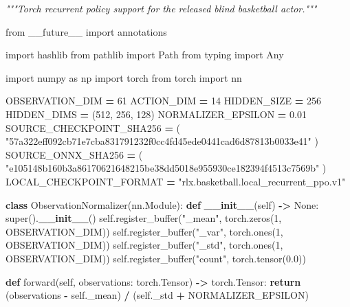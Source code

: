 \documentclass[
  chinese,
  11pt,
  letterpaper,
]{article}
\newenvironment{Shaded}{\begin{snugshade}}{\end{snugshade}}
\newcommand{\BuiltInTok}[1]{#1}
\newcommand{\CommentTok}[1]{\textcolor[rgb]{0.56,0.35,0.01}{\textit{#1}}}
\newcommand{\ControlFlowTok}[1]{\textcolor[rgb]{0.13,0.29,0.53}{\textbf{#1}}}
\newcommand{\DecValTok}[1]{\textcolor[rgb]{0.00,0.00,0.81}{#1}}
\newcommand{\FloatTok}[1]{\textcolor[rgb]{0.00,0.00,0.81}{#1}}
\newcommand{\FunctionTok}[1]{\textcolor[rgb]{0.13,0.29,0.53}{\textbf{#1}}}
\newcommand{\ImportTok}[1]{#1}
\newcommand{\KeywordTok}[1]{\textcolor[rgb]{0.13,0.29,0.53}{\textbf{#1}}}
\newcommand{\NormalTok}[1]{#1}
\newcommand{\OperatorTok}[1]{\textcolor[rgb]{0.81,0.36,0.00}{\textbf{#1}}}
\newcommand{\StringTok}[1]{\textcolor[rgb]{0.31,0.60,0.02}{#1}}
\newcommand{\VariableTok}[1]{\textcolor[rgb]{0.00,0.00,0.00}{#1}}
\renewenvironment{Shaded}{\par\smallskip}{\par\smallskip}
\begin{document}
\begin{Shaded}
\begin{Highlighting}[]
\CommentTok{"""Torch recurrent policy support for the released blind basketball actor."""}

\ImportTok{from}\NormalTok{ \_\_future\_\_ }\ImportTok{import}\NormalTok{ annotations}

\ImportTok{import}\NormalTok{ hashlib}
\ImportTok{from}\NormalTok{ pathlib }\ImportTok{import}\NormalTok{ Path}
\ImportTok{from}\NormalTok{ typing }\ImportTok{import}\NormalTok{ Any}

\ImportTok{import}\NormalTok{ numpy }\ImportTok{as}\NormalTok{ np}
\ImportTok{import}\NormalTok{ torch}
\ImportTok{from}\NormalTok{ torch }\ImportTok{import}\NormalTok{ nn}

\NormalTok{OBSERVATION\_DIM }\OperatorTok{=} \DecValTok{61}
\NormalTok{ACTION\_DIM }\OperatorTok{=} \DecValTok{14}
\NormalTok{HIDDEN\_SIZE }\OperatorTok{=} \DecValTok{256}
\NormalTok{HIDDEN\_DIMS }\OperatorTok{=}\NormalTok{ (}\DecValTok{512}\NormalTok{, }\DecValTok{256}\NormalTok{, }\DecValTok{128}\NormalTok{)}
\NormalTok{NORMALIZER\_EPSILON }\OperatorTok{=} \FloatTok{0.01}
\NormalTok{SOURCE\_CHECKPOINT\_SHA256 }\OperatorTok{=}\NormalTok{ (}
    \StringTok{"57a322eff092cb71e7cba831791232f0cc4fd45ede0441cad6d87813b0033e41"}
\NormalTok{)}
\NormalTok{SOURCE\_ONNX\_SHA256 }\OperatorTok{=}\NormalTok{ (}
    \StringTok{"e105148b160b3a86170621648215be38dd5018e955930ce182394f4513c7569b"}
\NormalTok{)}
\NormalTok{LOCAL\_CHECKPOINT\_FORMAT }\OperatorTok{=} \StringTok{"rlx.basketball.local\_recurrent\_ppo.v1"}


\KeywordTok{class}\NormalTok{ ObservationNormalizer(nn.Module):}
    \KeywordTok{def} \FunctionTok{\_\_init\_\_}\NormalTok{(}\VariableTok{self}\NormalTok{) }\OperatorTok{{-}\textgreater{}} \VariableTok{None}\NormalTok{:}
        \BuiltInTok{super}\NormalTok{().}\FunctionTok{\_\_init\_\_}\NormalTok{()}
        \VariableTok{self}\NormalTok{.register\_buffer(}\StringTok{"\_mean"}\NormalTok{, torch.zeros(}\DecValTok{1}\NormalTok{, OBSERVATION\_DIM))}
        \VariableTok{self}\NormalTok{.register\_buffer(}\StringTok{"\_var"}\NormalTok{, torch.ones(}\DecValTok{1}\NormalTok{, OBSERVATION\_DIM))}
        \VariableTok{self}\NormalTok{.register\_buffer(}\StringTok{"\_std"}\NormalTok{, torch.ones(}\DecValTok{1}\NormalTok{, OBSERVATION\_DIM))}
        \VariableTok{self}\NormalTok{.register\_buffer(}\StringTok{"count"}\NormalTok{, torch.tensor(}\FloatTok{0.0}\NormalTok{))}

    \KeywordTok{def}\NormalTok{ forward(}\VariableTok{self}\NormalTok{, observations: torch.Tensor) }\OperatorTok{{-}\textgreater{}}\NormalTok{ torch.Tensor:}
        \ControlFlowTok{return}\NormalTok{ (observations }\OperatorTok{{-}} \VariableTok{self}\NormalTok{.\_mean) }\OperatorTok{/}\NormalTok{ (}\VariableTok{self}\NormalTok{.\_std }\OperatorTok{+}\NormalTok{ NORMALIZER\_EPSILON)}



\end{Highlighting}
\end{Shaded}
\end{document}
